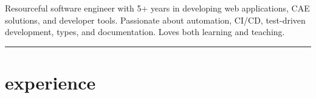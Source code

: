 \documentclass{mycv}
\begin{document}
\header{\phone}{\github}{\email}{\linkedin}

\begin{objective}
    Resourceful software engineer with 5+ years in developing web applications, CAE solutions, and developer tools.
    Passionate about automation, CI/CD, test-driven development, types, and documentation.
    Loves both learning and teaching.
\end{objective}

\vspace{-\parskip}\noindent\rule{\textwidth}{0.4pt}

\section{experience}
\end{document}
